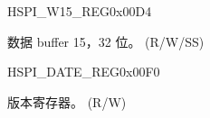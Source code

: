 \begin{register}{H}{SPI\_W15\_REG}{0x00D4}\label{regdesc:SPIW15REG}
%
\regnewline%
\begin{regdesc}\begin{reglist}
\label{fielddesc:SPIBUF15}\item [SPI\_BUF15] 数据 buffer 15，32 位。 (R/W/SS)
\end{reglist}\end{regdesc}
\end{register}


\begin{register}{H}{SPI\_DATE\_REG}{0x00F0}\label{regdesc:SPIDATEREG}
%
%
\regnewline%
\begin{regdesc}\begin{reglist}
\label{fielddesc:SPIDATE}\item [SPI\_DATE] 版本寄存器。 (R/W)
\end{reglist}\end{regdesc}
\end{register}


